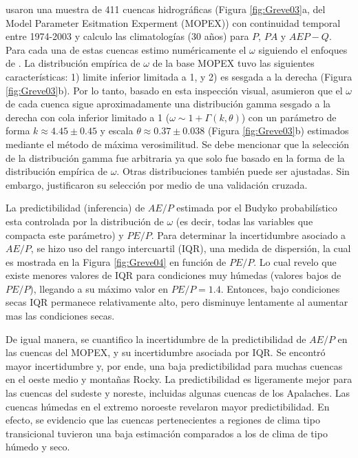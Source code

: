 \documentclass[12pt]{article}
\begin{document}
\citet{Greve2015} usaron una muestra de 411 cuencas hidrográficas (Figura \ref{fig:Greve03}a, del Model Parameter Esitmation Experment (MOPEX)) con continuidad temporal entre 1974-2003 y calculo las climatologías (30 años) para $P$, $PA$ y $AE P - Q$. Para cada una de estas cuencas estimo numéricamente el $\omega$ siguiendo el enfoques de \citet{Zhang2004}. La distribución empírica de $\omega$ de la base MOPEX tuvo las siguientes características: 1) limite inferior limitada a 1, y 2) es sesgada a la derecha (Figura \ref{fig:Greve03}b). Por lo tanto, basado en esta inspección visual, \citet{Greve2015} asumieron que el $\omega$ de cada cuenca sigue aproximadamente una distribución gamma sesgado a la derecha con cola inferior limitado a 1 ($\omega \sim 1 + \Gamma (k, \theta )$) con un parámetro de forma $k \approx 4.45 \pm 0.45$ y escala $\theta \approx 0.37 \pm 0.038$ (Figura \ref{fig:Greve03}b) estimados mediante el método de máxima verosimilitud. Se debe mencionar que la selección de la distribución gamma fue arbitraria ya que solo fue basado en la forma de la distribución empírica de $\omega$. Otras distribuciones también puede ser ajustadas. Sin embargo, \citet{Greve2015} justificaron su selección por medio de una validación cruzada.

La predictibilidad (inferencia) de $AE/P$ estimada por el Budyko probabilístico esta controlada por la distribución de $\omega$ (es decir, todas las variables que compacta este parámetro) y $PE/P$. Para determinar la incertidumbre asociado a $AE/P$, se hizo uso del rango intercuartil (IQR), una medida de dispersión, la cual es mostrada en la Figura \ref{fig:Greve04} en función de $PE/P$. Lo cual revelo que existe menores valores de IQR para condiciones muy húmedas (valores bajos de $PE/P$), llegando a su máximo valor en $PE/P = 1.4$. Entonces, bajo condiciones secas IQR permanece relativamente alto, pero disminuye lentamente al aumentar mas las condiciones secas. %

De igual manera, se cuantifico la incertidumbre de la predictibilidad de $AE/P$ en las cuencas del MOPEX, y su incertidumbre asociada por IQR. Se encontró mayor incertidumbre y, por ende, una baja predictibilidad para muchas cuencas en el oeste medio y montañas Rocky. La predictibilidad es ligeramente mejor para las cuencas del sudeste y noreste, incluidas algunas cuencas de los Apalaches. Las cuencas húmedas en el extremo noroeste revelaron mayor predictibilidad. En efecto, se evidencio que las cuencas pertenecientes a regiones de clima tipo transicional tuvieron una baja estimación comparados a los de clima de tipo húmedo y seco.
\end{document}
